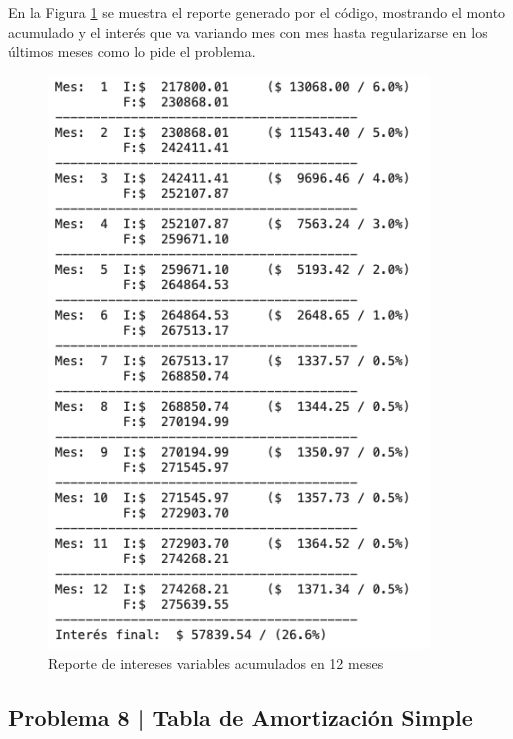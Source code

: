 \documentclass{article}
\begin{document}
\break
\noindent
En la Figura \ref{fig:s107-2} se muestra el reporte generado por el código, mostrando el monto acumulado y el interés que va variando mes con mes hasta regularizarse en los últimos meses como lo pide el problema.
\begin{figure}[!ht]
    \centering
    \begin{minipage}{\textwidth}
        \centering
        \includegraphics[width=0.9\textwidth]{figures/s107-2.png}
    \end{minipage}
    \captionsetup{width=0.9\textwidth}
    \caption{Reporte de intereses variables acumulados en 12 meses}
    \label{fig:s107-2}
\end{figure}

\clearpage

\subsection*{Problema 8 | Tabla de Amortización Simple}
\end{document}
